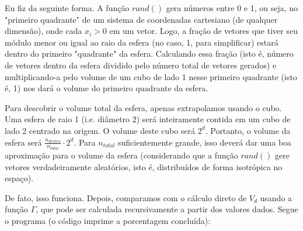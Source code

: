 \documentclass[12pt,a4paper]{article}
\begin{document}
Eu fiz da seguinte forma. A função $rand()$ gera números entre 0 e 1, ou seja, no "primeiro quadrante" de um sistema de coordenadas cartesiano (de qualquer dimensão), onde cada $x_i > 0$ em um vetor. Logo, a fração de vetores que tiver seu módulo menor ou igual ao raio da esfera (no caso, 1, para simplificar) estará dentro do primeiro "quadrante" da esfera. Calculando essa fração (isto é, número de vetores dentro da esfera dividido pelo número total de vetores gerados) e multiplicando-a pelo volume de um cubo de lado 1 nesse primeiro quadrante (isto é, 1) nos dará o volume do primeiro quadrante da esfera.

Para descobrir o volume total da esfera, apenas extrapolamos usando o cubo. Uma esfera de raio 1 (i.e. diâmetro 2) será inteiramente contida em um cubo de lado 2 centrado na origem. O volume deste cubo será $2^d$. Portanto, o volume da esfera será $\frac{n_{dentro}}{n_{total}}\cdot 2^d$. Para $n_{total}$ suficientemente grande, isso deverá dar uma boa aproximação para o volume da esfera (considerando que a função $rand()$ gere vetores verdadeiramente aleatórios, isto é, distribuídos de forma isotrópica no espaço).

De fato, isso funciona. Depois, comparamos com o cálculo direto de $V_d$ usando a função $\Gamma$, que pode ser calculada recursivamente a partir dos valores dados. Segue o programa (o código imprime a porcentagem concluída):
\end{document}

